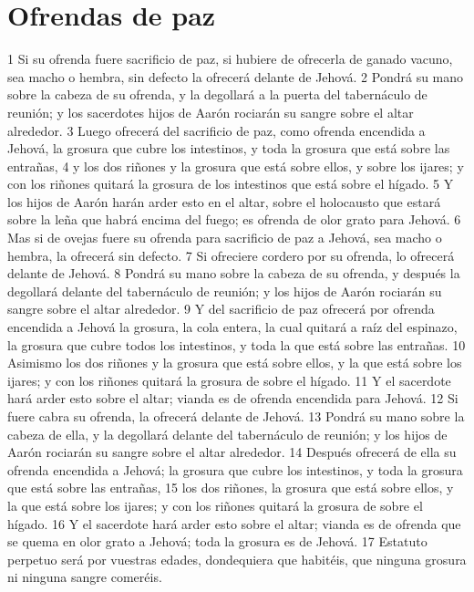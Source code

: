 \section{Ofrendas de paz}

1 Si su ofrenda fuere sacrificio de paz, si hubiere de ofrecerla de ganado vacuno, sea macho o hembra, sin defecto la ofrecerá delante de Jehová.
2 Pondrá su mano sobre la cabeza de su ofrenda, y la degollará a la puerta del tabernáculo de reunión; y los sacerdotes hijos de Aarón rociarán su sangre sobre el altar alrededor.
3 Luego ofrecerá del sacrificio de paz, como ofrenda encendida a Jehová, la grosura que cubre los intestinos, y toda la grosura que está sobre las entrañas,
4 y los dos riñones y la grosura que está sobre ellos, y sobre los ijares; y con los riñones quitará la grosura de los intestinos que está sobre el hígado.
5 Y los hijos de Aarón harán arder esto en el altar, sobre el holocausto que estará sobre la leña que habrá encima del fuego; es ofrenda de olor grato para Jehová.
6 Mas si de ovejas fuere su ofrenda para sacrificio de paz a Jehová, sea macho o hembra, la ofrecerá sin defecto.
7 Si ofreciere cordero por su ofrenda, lo ofrecerá delante de Jehová.
8 Pondrá su mano sobre la cabeza de su ofrenda, y después la degollará delante del tabernáculo de reunión; y los hijos de Aarón rociarán su sangre sobre el altar alrededor.
9 Y del sacrificio de paz ofrecerá por ofrenda encendida a Jehová la grosura, la cola entera, la cual quitará a raíz del espinazo, la grosura que cubre todos los intestinos, y toda la que está sobre las entrañas.
10 Asimismo los dos riñones y la grosura que está sobre ellos, y la que está sobre los ijares; y con los riñones quitará la grosura de sobre el hígado.
11 Y el sacerdote hará arder esto sobre el altar; vianda es de ofrenda encendida para Jehová.
12 Si fuere cabra su ofrenda, la ofrecerá delante de Jehová.
13 Pondrá su mano sobre la cabeza de ella, y la degollará delante del tabernáculo de reunión; y los hijos de Aarón rociarán su sangre sobre el altar alrededor.
14 Después ofrecerá de ella su ofrenda encendida a Jehová; la grosura que cubre los intestinos, y toda la grosura que está sobre las entrañas,
15 los dos riñones, la grosura que está sobre ellos, y la que está sobre los ijares; y con los riñones quitará la grosura de sobre el hígado.
16 Y el sacerdote hará arder esto sobre el altar; vianda es de ofrenda que se quema en olor grato a Jehová; toda la grosura es de Jehová.
17 Estatuto perpetuo será por vuestras edades, dondequiera que habitéis, que ninguna grosura ni ninguna sangre comeréis.  

